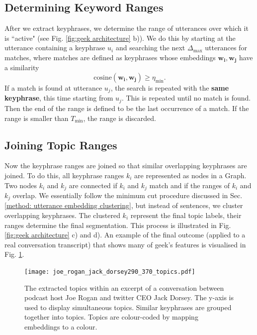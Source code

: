     \subsection{Determining Keyword Ranges}
        After we extract \glspl{keyphrase}, we determine the range of \glspl{utterance} over which it is ``active" (see Fig. \ref{fig:geek architecture} b)). We do this by starting at the \gls{utterance} containing a \gls{keyphrase} $u_i$ and searching the next $\Delta_{\text{max}}$ \glspl{utterance} for matches, where matches are defined as \glspl{keyphrase} whose \glspl{embedding} $\mathbf{w_i}, \mathbf{w_j}$ have a similarity
        \begin{equation}
            \text{cosine}(\mathbf{w_i}, \mathbf{w_j}) \geq \eta_{\text{min}}.
        \end{equation}
        If a match is found at \gls{utterance} $u_j$, the search is repeated with the \textbf{same \gls{keyphrase}}, this time starting from $u_j$. This is repeated until no match is found. Then the end of the range is defined to be the last occurrence of a match. If the range is smaller than $T_{\text{min}}$, the range is discarded.

    \subsection{Joining Topic Ranges}
        Now the \gls{keyphrase} ranges are joined so that similar overlapping \glspl{keyphrase} are joined. To do this, all \gls{keyphrase} ranges $k_i$ are represented as nodes in a Graph. Two nodes $k_i$ and $k_j$ are connected if $k_i$ and $k_j$ match and if the ranges of $k_i$ and $k_j$ overlap. We essentially follow the minimum cut procedure discussed in Sec. \ref{method: utterance embedding clustering}, but instead of sentences, we cluster overlapping \glspl{keyphrase}. The clustered $k_i$ represent the final topic labels, their ranges determine the final segmentation. This process is illustrated in Fig. \ref{fig:geek architecture} c) and d). An example of the final outcome (applied to a real conversation transcript) that shows many of \gls{geek}'s features is visualised in Fig. \ref{fig:GEEK final result}.

        \begin{figure}
            \centering
            \texttt{[image: joe\_rogan\_jack\_dorsey290\_370\_topics.pdf]}
            \caption{The extracted topics within an excerpt of a conversation between podcast host Joe Rogan and twitter CEO Jack Dorsey. The y-axis is used to display simultaneous topics. Similar \glspl{keyphrase} are grouped together into topics. Topics are colour-coded by mapping \glspl{embedding} to a colour.}
            \label{fig:GEEK final result}
        \end{figure}

